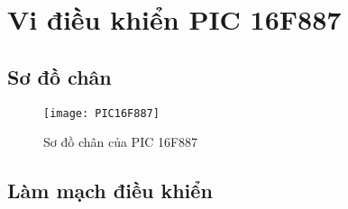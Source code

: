 \section{Vi điều khiển PIC 16F887}
\subsection{Sơ đồ chân}
\begin{figure}[!h]
\begin{center}
\texttt{[image: PIC16F887]}
\end{center}
\caption{Sơ đồ chân của PIC 16F887}
\end{figure}
\subsection{Làm mạch điều khiển}
